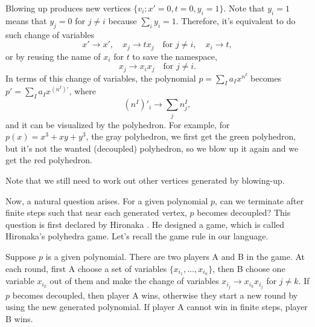 \documentclass[12pt]{article}
\theoremstyle{definition}
\theoremstyle{plain}
\begin{document}
Blowing up produces new vertices 
$
	\{v_i:x'=0,t=0,y_i=1\}
$.
Note that $y_i=1$ means that $y_j=0$ for $j\neq i$ because $\sum_i y_i=1$. Therefore, it's equivalent to 
do such change of variables
\[
	x'\to x',\quad x_j\to tx_j\quad \text{for $j\neq i$},\quad x_i\to t,
\]
or by reusing the name of $x_i$ for $t$ to save the namespace,
\[
	x_j\to x_ix_j\quad \text{for $j\neq i$}.
\]
In terms of this change of variables, the polynomial $p=\sum_I a_I x^{n^I}$ becomes 
$p'=\sum_I a_I x^{(n^I)'}$, where
\[
	(n^I)'_i\longrightarrow \sum_j n^I_j,
\]
and it can be visualized by the polyhedron.
For example, for $p(x)=x^3+xy+y^3$, the gray polyhedron, we first get the green polyhedron, 
but it's not the wanted (decoupled) polyhedron, so we blow up it again and we get the red polyhedron.
\begin{center}
\end{center}
Note that we still need to work out other vertices generated by blowing-up. 

Now, a natural question arises. For a given polynomial $p$, 
can we terminate after finite steps such that near each generated vertex, $p$ becomes 
decoupled? This question is first declared by Hironaka \cite{}. He designed a game, which is 
called Hironaka's polyhedra game. Let's recall the game rule in our language.

Suppose $p$ is a given polynomial. There are two players A and B in the game. 
At each round, first A choose a set of variables $\{x_{i_1},\dots,x_{i_n}\}$, then
B choose one variable $x_{i_k}$ out of them and make the change of variables 
$x_{i_j} \to x_{i_k}x_{i_j}$ for $j\neq k$.
If $p$ becomes decoupled, then player A wins, otherwise they start a new round by using the 
new generated polynomial. If player A cannot win in finite steps, player B wins.
\end{document}
